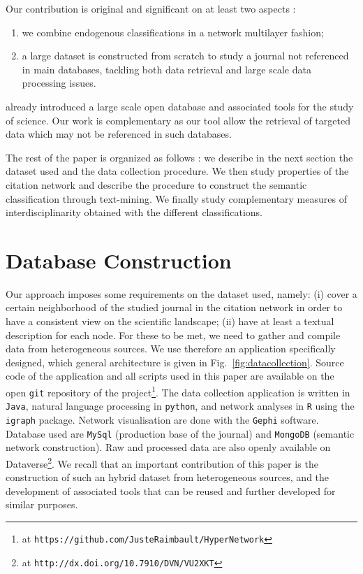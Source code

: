 \documentclass[10pt]{article}
\begin{document}
Our contribution is original and significant on at least two aspects :
\begin{enumerate}
	\item we combine endogenous classifications in a network multilayer fashion;
	\item a large dataset is constructed from scratch to study a journal not referenced in main databases, tackling both data retrieval and large scale data processing issues.
\end{enumerate}

\cite{light2014open} already introduced a large scale open database and associated tools for the study of science. Our work is complementary as our tool allow the retrieval of targeted data which may not be referenced in such databases.

The rest of the paper is organized as follows : we describe in the next section the dataset used and the data collection procedure. We then study properties of the citation network and describe the procedure to construct the semantic classification through text-mining. We finally study complementary measures of interdisciplinarity obtained with the different classifications.




\section*{Database Construction}
\label{sec:data}



Our approach imposes some requirements on the dataset used, namely: (i) cover a certain neighborhood of the studied journal in the citation network in order to have a consistent view on the scientific landscape; (ii) have at least a textual description for each node. For these to be met, we need to gather and compile data from heterogeneous sources. We use therefore an application specifically designed, which general architecture is given in Fig.~\ref{fig:datacollection}. Source code of the application and all scripts used in this paper are available on the open \texttt{git} repository of the project\footnote{at \texttt{https://github.com/JusteRaimbault/HyperNetwork}}. The data collection application is written in \texttt{Java}, natural language processing in \texttt{python}, and network analyses in \texttt{R} using the \texttt{igraph} package. Network visualisation are done with the \texttt{Gephi} software. Database used are \texttt{MySql} (production base of the journal) and \texttt{MongoDB} (semantic network construction). Raw and processed data are also openly available on Dataverse\footnote{at \texttt{http://dx.doi.org/10.7910/DVN/VU2XKT}}. We recall that an important contribution of this paper is the construction of such an hybrid dataset from heterogeneous sources, and the development of associated tools that can be reused and further developed for similar purposes.
\end{document}
